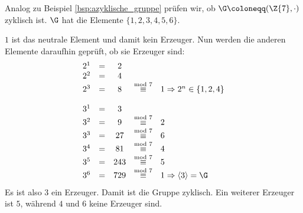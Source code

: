 \begin{beispiel}
  Analog zu Beispiel \ref{bsp:azyklische_gruppe} prüfen wir, ob $\G \coloneqq
  (\Z{7}, \cdot)$ zyklisch ist. $\G$ hat die Elemente $\{1, 2, 3, 4, 5,
  6\}$.

  $1$ ist das neutrale Element und damit kein Erzeuger. Nun werden die
  anderen Elemente daraufhin geprüft, ob sie Erzeuger sind:
\[  \begin{array}[]{ccccl}
    2^1 &= & 2 & &\\
    2^2 &= & 4 & &\\
    2^3 &= & 8 &\stackrel{\text{mod 7}}{\equiv}& 1 \Rightarrow 2^n \in \{1, 2, 4\}\\
\\    
    3^1 &= & 3 & &\\
    3^2 &= & 9  & \stackrel{\text{mod 7}}{\equiv}& 2\\
    3^3 &= & 27 & \stackrel{\text{mod 7}}{\equiv}& 6\\
    3^4 &= & 81 & \stackrel{\text{mod 7}}{\equiv}& 4\\
    3^5 &= & 243& \stackrel{\text{mod 7}}{\equiv}& 5\\
    3^6 &= & 729& \stackrel{\text{mod 7}}{\equiv}& 1 \Rightarrow \langle 3\rangle = \G
   \end{array}\]
  Es ist also $3$ ein Erzeuger. Damit ist die Gruppe zyklisch. Ein
  weiterer Erzeuger ist $5$, während $4$ und $6$ keine Erzeuger sind.

\end{beispiel}